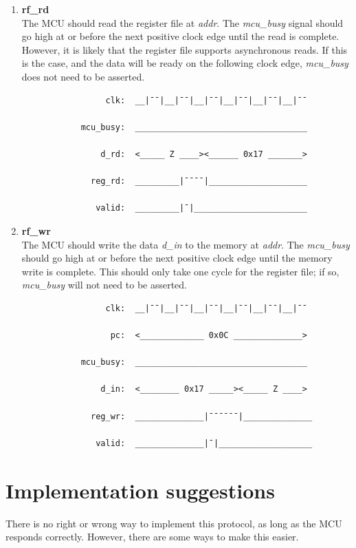 \documentclass[10pt,a4paper]{article}
\begin{document}
\begin{enumerate}
    \item\textbf{rf\_rd}\\
    The MCU should read the register file at \emph{addr}. The \emph{mcu\_busy} signal should go
    high at or before the next positive clock edge until the read is complete. However, it is
    likely that the register file supports asynchronous reads. If this is the case, and the data
    will be ready on the following clock edge, \emph{mcu\_busy} does not need to be asserted.

        \begin{verbatim}
                 clk:  __|¯¯|__|¯¯|__|¯¯|__|¯¯|__|¯¯|__|¯¯

            mcu_busy:  ___________________________________

                d_rd:  <_____ Z ____><______ 0x17 _______>

              reg_rd:  _________|¯¯¯¯|____________________

               valid:  _________|¯|_______________________
        \end{verbatim}

    \item\textbf{rf\_wr}\\
    The MCU should write the data \emph{d\_in} to the memory at \emph{addr}. The \emph{mcu\_busy} 
    should go high at or before the next positive clock edge until the memory write is complete.
    This should only take one cycle for the register file; if so, \emph{mcu\_busy} will not need to
    be asserted.

        \begin{verbatim}
                 clk:  __|¯¯|__|¯¯|__|¯¯|__|¯¯|__|¯¯|__|¯¯

                  pc:  <_____________ 0x0C ______________>

            mcu_busy:  ___________________________________

                d_in:  <________ 0x17 _____><_____ Z ____> 

              reg_wr:  ______________|¯¯¯¯¯¯|______________

               valid:  ______________|¯|___________________
        \end{verbatim}

\end{enumerate}

\newpage
\section{Implementation suggestions}
There is no right or wrong way to implement this protocol, as long as the MCU responds correctly.
However, there are some ways to make this easier.
\end{document}
